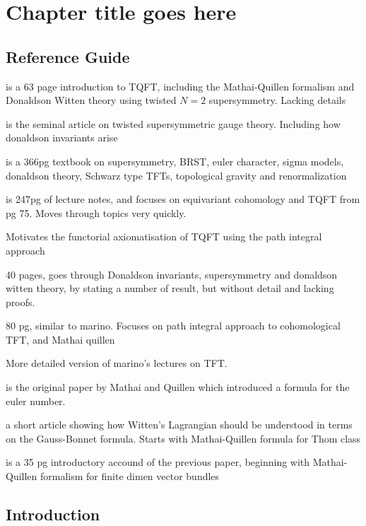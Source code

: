 
\chapter{Chapter title goes here}
\label{chapter1}
\section{Reference Guide}
\cite{cernTQFT} is a 63 page introduction to TQFT, including the Mathai-Quillen
formalism and Donaldson Witten theory using twisted $N=2$ supersymmetry.
Lacking details

\cite{wittentTQFT} is the seminal article on twisted supersymmetric gauge theory.
Including how donaldson invariants arise

\cite{birminghamTFT} is a 366pg textbook on supersymmetry, BRST, euler
character, sigma models, donaldson theory, Schwarz type TFTs, topological
gravity and renormalization

\cite{cordes95} is 247pg of lecture notes, and focuses on equivariant cohomology
and TQFT from pg 75. Moves through topics very quickly.

\cite{axiomTQFTintro} Motivates the functorial axiomatisation of TQFT using the
path integral approach

\cite{marino} 40 pages, goes through Donaldson invariants, supersymmetry and donaldson
witten theory, by stating a number of result, but without detail and lacking
proofs. 

\cite{moore} 80 pg, similar to marino. Focuses on path integral approach to
cohomological TFT, and Mathai quillen

\cite{TQFTbook} More detailed version of marino's lectures on TFT. 

\cite{MQformula} is the original paper by Mathai and Quillen which introduced a
formula for the euler number.

\cite{atiyahlagrangians} a short article showing how Witten's Lagrangian should
be understood in terms on the Gauss-Bonnet formula. Starts with Mathai-Quillen
formula for Thom class

\cite{MQintro} is a 35 pg introductory accound of the previous paper, beginning
with Mathai-Quillen formalism for finite dimen vector bundles


\section{Introduction}


